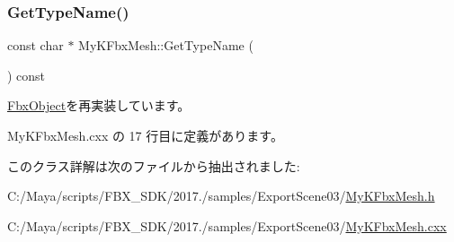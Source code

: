 \subsubsection{\texorpdfstring{Get\+Type\+Name()}{GetTypeName()}}
{\footnotesize\ttfamily const char $\ast$ My\+K\+Fbx\+Mesh\+::\+Get\+Type\+Name (\begin{DoxyParamCaption}{ }\end{DoxyParamCaption}) const\hspace{0.3cm}{\ttfamily [virtual]}}



\hyperlink{class_fbx_object_a817dcfa8f7f7e2437324e1e71377c4b2}{Fbx\+Object}を再実装しています。



 My\+K\+Fbx\+Mesh.\+cxx の 17 行目に定義があります。



このクラス詳解は次のファイルから抽出されました\+:\begin{DoxyCompactItemize}
\item 
C\+:/\+Maya/scripts/\+F\+B\+X\+\_\+\+S\+D\+K/2017./samples/\+Export\+Scene03/\hyperlink{_my_k_fbx_mesh_8h}{My\+K\+Fbx\+Mesh.\+h}\item 
C\+:/\+Maya/scripts/\+F\+B\+X\+\_\+\+S\+D\+K/2017./samples/\+Export\+Scene03/\hyperlink{_my_k_fbx_mesh_8cxx}{My\+K\+Fbx\+Mesh.\+cxx}\end{DoxyCompactItemize}
